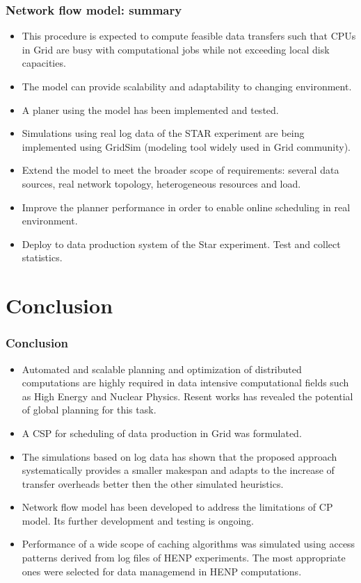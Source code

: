 \documentclass{beamer}
\begin{document}
\begin{frame}\frametitle{Network flow model: summary}
\begin{small}
\begin{block}{}
\begin{itemize}
\item This procedure is expected to compute feasible data transfers such that
CPUs in Grid are busy with computational jobs while not exceeding local disk capacities.
\item The model can provide scalability and adaptability to changing environment.
\item A planer using the model has been implemented and tested.
\item Simulations using real log data of the STAR experiment are being implemented using GridSim (modeling tool widely used in Grid community).   
\item Extend the model to meet the broader scope of requirements: several data sources, real network topology, heterogeneous resources and load.  
\item Improve the planner performance in order to enable online scheduling in real environment. 
\item Deploy to data production system of the Star experiment. Test and collect statistics.
\end{itemize}
\end{block}
\end{small}
\end{frame}


\section{Conclusion}

\begin{frame}\frametitle{Conclusion}
\begin{block}{}
\begin{itemize}
\item Automated and scalable planning and optimization of distributed computations are highly required in data intensive computational fields such as High Energy and Nuclear Physics. Resent works has revealed the potential of global planning for this task.
\item A CSP for scheduling of data production in Grid was formulated. 
\item The simulations based on log data has shown that the proposed approach systematically provides a smaller makespan and adapts to the increase of transfer overheads better then the other simulated  heuristics.
\item Network flow model has been developed to address the limitations of CP model. Its further development and testing is ongoing.
\item Performance of a wide scope of caching algorithms was simulated using access patterns derived from log files of HENP experiments. The most appropriate ones were selected for data managemend in HENP computations. 
\end{itemize}
\end{block}
\end{frame}
\end{document}
